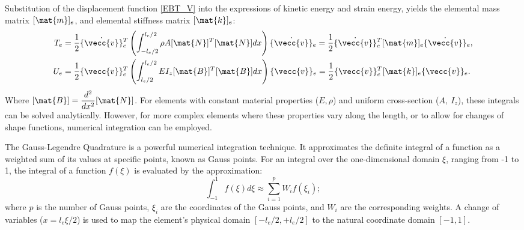 Substitution of the displacement function \ref{EBT_V} into the expressions of kinetic energy and strain energy, yields the elemental mass matrix $[\mat{m}]_e$, and elemental stiffness matrix $[\mat{k}]_e$:
\begin{align}
    T_e &= \frac{1}{2} \{\dot{\vecc{v}}\}_e^T \left( \int_{-l_e/2}^{l_e/2} \rho A [\mat{N}]^T [\mat{N}] dx \right) \{\dot{\vecc{v}}\}_e = \frac{1}{2} \{\dot{\vecc{v}}\}_e^T [\mat{m}]_e \{\dot{\vecc{v}}\}_e, \\
    U_e &= \frac{1}{2} \{\vecc{v}\}_e^T \left( \int_{l_e/2}^{l_e/2} EI_z [\mat{B}]^T [\mat{B}] dx \right) \{\vecc{v}\}_e = \frac{1}{2} \{\vecc{v}\}_e^T [\mat{k}]_e \{\vecc{v}\}_e.
\end{align}
Where $[\mat{B}] = \dfrac{d^2}{dx^2}[\mat{N}]$. For elements with constant material properties ($E, \rho$) and uniform cross-section ($A,\: I_z$), these integrals can be solved analytically. However, for more complex elements where these properties vary along the length, or to allow for changes of shape functions, numerical integration can be employed.

The Gauss-Legendre Quadrature is a powerful numerical integration technique. It approximates the definite integral of a function as a weighted sum of its values at specific points, known as Gauss points. For an integral over the one-dimensional domain $\xi$, ranging from -1 to 1, the integral of a function $f(\xi)$ is evaluated by the approximation:
\begin{equation}
    \int_{-1}^{1} f(\xi) d\xi \approx \sum_{i=1}^{p} W_i f(\xi_i);
\end{equation}
where $p$ is the number of Gauss points, $\xi_i$ are the coordinates of the Gauss points, and $W_i$ are the corresponding weights. A change of variables ($x = l_e\xi/2$) is used to map the element's physical domain $[-l_e/2, +l_e/2]$ to the natural coordinate domain $[-1, 1]$.

